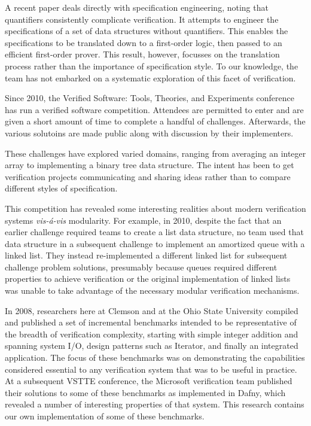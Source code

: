 A recent paper\cite{bouillaguetJahobFirstOrder} deals directly with specification engineering, noting that quantifiers consistently complicate verification.  It attempts to engineer the specifications of a set of data structures without quantifiers.  This enables the specifications to be translated down to a first-order logic, then passed to an efficient first-order prover.  This result, however, focusses on the translation process rather than the importance of specification style.  To our knowledge, the team has not embarked on a systematic exploration of this facet of verification.

Since 2010, the Verified Software: Tools, Theories, and Experiments conference has run a verified software competition.  Attendees are permitted to enter and are given a short amount of time to complete a handful of challenges.  Afterwards, the various solutoins are made public along with discussion by their implementers.

These challenges have explored varied domains, ranging from averaging an integer array to implementing a binary tree data structure.  The intent has been to get verification projects communicating and sharing ideas rather than to compare different styles of specification.  

This competition has revealed some interesting realities about modern verification systems \emph{vis-\'{a}-vis} modularity.  For example, in 2010, despite the fact that an earlier challenge required teams to create a list data structure, no team used that data structure in a subsequent challenge to implement an amortized queue with a linked list.  They instead re-implemented a different linked list for subsequent challenge problem solutions, presumably because queues required different properties to achieve verification or the original implementation of linked lists was unable to take advantage of the necessary modular verification mechanisms.

In 2008, researchers here at Clemson and at the Ohio State University compiled and published\cite{Benchmarks} a set of incremental benchmarks intended to be representative of the breadth of verification complexity, starting with simple integer addition and spanning system I/O, design patterns such as Iterator, and finally an integrated application.  The focus of these benchmarks was on demonstrating the capabilities considered essential to any verification system that was to be useful in practice.  At a subsequent VSTTE conference, the Microsoft verification team published their solutions to some of these benchmarks as implemented in Dafny\cite{DafnySolutions}, which revealed a number of interesting properties of that system.  This research contains our own implementation of some of these benchmarks.
